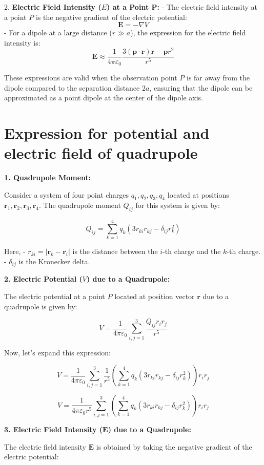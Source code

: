 \documentclass[a4paper, 12pt]{article}
\begin{document}
2. {\bf Electric Field Intensity (\(E\)) at a Point P:}
   - The electric field intensity at a point \(P\) is the negative gradient of the electric potential:
     \[ \mathbf{E} = -\nabla V \]
   - For a dipole at a large distance (\(r \gg a\)), the expression for the electric field intensity is:
     \[ \mathbf{E} \approx \frac{1}{4\pi\varepsilon_0} \frac{3(\mathbf{p} \cdot \mathbf{r})\mathbf{r} - \mathbf{p}r^2}{r^5} \]

These expressions are valid when the observation point \(P\) is far away from the dipole compared to the separation distance \(2a\), ensuring that the dipole can be approximated as a point dipole at the center of the dipole axis.


\section*{Expression for potential and electric field of quadrupole}

{\bf 1. Quadrupole Moment:}

Consider a system of four point charges \(q_1, q_2, q_3, q_4\) located at positions \(\mathbf{r}_1, \mathbf{r}_2, \mathbf{r}_3, \mathbf{r}_4\). The quadrupole moment \(Q_{ij}\) for this system is given by:

\[ Q_{ij} = \sum_{k=1}^4 q_k \left(3r_{ki} r_{kj} - \delta_{ij} r_k^2\right) \]

Here,
- \(r_{ki} = |\mathbf{r}_k - \mathbf{r}_i|\) is the distance between the \(i\)-th charge and the \(k\)-th charge.
- \(\delta_{ij}\) is the Kronecker delta.

{\bf 2. Electric Potential (\(V\)) due to a Quadrupole:}

The electric potential at a point \(P\) located at position vector \(\mathbf{r}\) due to a quadrupole is given by:

\[ V = \frac{1}{4\pi\varepsilon_0} \sum_{i,j=1}^3 \frac{Q_{ij} r_i r_j}{r^5} \]

Now, let's expand this expression:

\[ V = \frac{1}{4\pi\varepsilon_0} \sum_{i,j=1}^3 \frac{1}{r^5} \left(\sum_{k=1}^4 q_k \left(3r_{ki} r_{kj} - \delta_{ij} r_k^2\right)\right) r_i r_j \]

\[ V = \frac{1}{4\pi\varepsilon_0 r^5} \sum_{i,j=1}^3 \left(\sum_{k=1}^4 q_k \left(3r_{ki} r_{kj} - \delta_{ij} r_k^2\right)\right) r_i r_j \]

{\bf 3. Electric Field Intensity (\(\mathbf{E}\)) due to a Quadrupole:}

The electric field intensity \(\mathbf{E}\) is obtained by taking the negative gradient of the electric potential:
\end{document}
